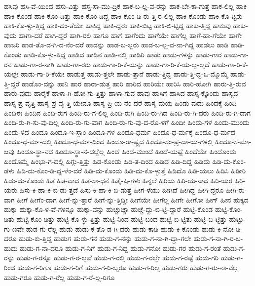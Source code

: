 {ಹಸಿವು
ಹಸಿ-ವೆ-ಯಿಂದ
ಹಸು-ವಿತ್ತು
ಹಸ್ತ-ಸಾ-ಮು-ದ್ರಿಕ
ಹಾಕ-ಬ-ಲ್ಲ-ವ-ರನ್ನು
ಹಾಕ-ಬೇ-ಕಾ-ಗುತ್ತೆ
ಹಾಕ-ಲಿಲ್ಲ
ಹಾಕಿ
ಹಾಕಿ-ಕೊಂಡ
ಹಾಕಿ-ಕೊಂ-ಡಿತ್ತು
ಹಾಕಿ-ಕೊಂ-ಡಿದ್ದ
ಹಾಕಿ-ಕೊಂ-ಡಿ-ರು-ತ್ತಿ-ರ-ಲಿಲ್ಲ
ಹಾಕಿ-ಕೊಂಡು
ಹಾಕಿ-ಕೊ-ಟ್ಟರು
ಹಾಕಿ-ಕೊ-ಳ್ಳು-ತ್ತಿದ್ದ
ಹಾಕಿ-ದಂ-ತೆಯೇ
ಹಾಕಿದ್ದ
ಹಾಕಿ-ದ್ದರು
ಹಾಕಿ-ಬಿಟ್ಟ
ಹಾಕಿ-ಬಿ-ಟ್ಟಿದ್ದ
ಹಾಕು-ತ್ತಿದ್ದ
ಹಾಕುವು
ಹಾಕು-ವುದು
ಹಾಗಾ-ದರೆ
ಹಾಗಿ-ದ್ದರೆ
ಹಾಗಿ-ರಲಿ
ಹಾಗೂ
ಹಾಗೆ
ಹಾಗೆಂದು
ಹಾಗೆಯೇ
ಹಾಗೆಲ್ಲ
ಹಾಗೆ-ಹಾ-ಗೆಯೇ
ಹಾಗೇ
ಹಾಜರಿ
ಹಾಡ-ತೊ-ಡ-ಗಿ-ದ-ನೆಂ-ದರೆ
ಹಾಡನ್ನು
ಹಾಡ-ಬ-ಲ್ಲರು
ಹಾಡ-ಬ-ಲ್ಲ-ವ-ನಾ-ಗಿದ್ದ
ಹಾಡಲು
ಹಾಡಿ
ಹಾಡಿ-ಕೊಂಡು
ಹಾಡಿ-ಕೊ-ಳ್ಳು-ತ್ತಿದ್ದ
ಹಾಡಿದ
ಹಾಡಿನ
ಹಾಡಿ-ನಲ್ಲಿ
ಹಾಡಿರಿ
ಹಾಡು
ಹಾಡು-ಗಳನ್ನು
ಹಾಡು-ಗಾರ
ಹಾಡು-ಗಾ-ರನ
ಹಾಡು-ಗಾ-ರ-ನಾಗಿ
ಹಾಡು-ಗಾ-ರರು
ಹಾಡು-ಗಾ-ರಿ-ಕೆ-ಯನ್ನು
ಹಾಡು-ಗಾ-ರಿ-ಕೆ-ಯ-ಲ್ಲ-ಲ್ಲದೆ
ಹಾಡು-ಗಾ-ರಿ-ಕೆ-ಯಲ್ಲೇ
ಹಾಡು-ಗಾ-ರಿ-ಕೆಯೇ
ಹಾಡುತ್ತ
ಹಾಡು-ತ್ತಲೇ
ಹಾಡು-ತ್ತಾನೆ
ಹಾಡು-ತ್ತಿದ್ದ
ಹಾಡು-ತ್ತಿ-ದ್ದ-ಒ-ಮ್ಮೊಮ್ಮೆ
ಹಾಡು-ತ್ತಿ-ದ್ದರೆ
ಹಾಡೊಂ-ದನ್ನು
ಹಾನಿ
ಹಾರ
ಹಾರಾ-ಡುತ್ತ
ಹಾರಿ
ಹಾರಿದ
ಹಾರಿಯೇ
ಹಾರಿಸಿ
ಹಾರಿ-ಹೋಗಿ
ಹಾರು-ತ್ತಿ-ರುವ
ಹಾರು-ವುದು
ಹಾರೈಕೆ
ಹಾಳಾ-ಗಿ-ಹೋ-ಗು-ತ್ತಿತ್ತು
ಹಾಳಾ-ಗುವ
ಹಾವು
ಹಾಸಿಗೆ
ಹಾಸಿದ
ಹಾಸ್ಯ-ಕ್ಕೊಂದು
ಹಾಸ್ಯದ
ಹಾಸ್ಯ-ಪ್ರ-ವೃತ್ತಿ
ಹಾಸ್ಯ-ಪ್ರ-ವೃ-ತ್ತಿ-ಯೇನೂ
ಹಾಸ್ಯ-ಪ್ರಿ-ಯ-ನೆಂ-ದರೆ
ಹಾಸ್ಯ-ಮಯ
ಹಿಂಡು-ವುದು
ಹಿಂದಕ್ಕೆ
ಹಿಂದಿ
ಹಿಂದಿಈ
ಹಿಂದಿನ
ಹಿಂದಿ-ರುಗ
ಹಿಂದಿ-ರು-ಗ-ಲಿಲ್ಲ
ಹಿಂದಿ-ರುಗಿ
ಹಿಂದಿ-ರು-ಗಿದ
ಹಿಂದಿ-ರು-ಗಿ-ದರು
ಹಿಂದಿ-ರು-ಗಿ-ದಾಗ
ಹಿಂದಿ-ರು-ಗಿ-ಸು-ವು-ದಿಲ್ಲ
ಹಿಂದಿ-ರು-ಗು-ವಾಗ
ಹಿಂದಿ-ರು-ಗು-ವು-ದ-ರೊ-ಳಗೆ
ಹಿಂದೀ
ಹಿಂದು-ಗಳ
ಹಿಂದು-ಮುಂದು
ಹಿಂದು-ಳಿದ
ಹಿಂದೂ
ಹಿಂದೂ-ಇ-ಸ್ಲಾಂ
ಹಿಂದೂ-ಗಳ
ಹಿಂದೂ-ಧರ್ಮ
ಹಿಂದೂ-ಧ-ರ್ಮಕ್ಕೆ
ಹಿಂದೂ-ಧ-ರ್ಮದ
ಹಿಂದೂ-ಧ-ರ್ಮ-ದಲ್ಲಿ
ಹಿಂದೂ-ಧ-ರ್ಮ-ದಿಂದ
ಹಿಂದೂ-ರಾ-ಷ್ಟ್ರದ
ಹಿಂದೂ-ಸಂ-ಪ್ರ-ದಾ-ಯ-ಗಳಲ್ಲಿ
ಹಿಂದೂ-ಸ-ಮಾ-ಜವು
ಹಿಂದೂ-ಸ್ಥಾ-ನದ
ಹಿಂದೂ-ಸ್ಥಾ-ನ-ದಲ್ಲೆಲ್ಲ
ಹಿಂದೆ
ಹಿಂದೆ-ಮುಂದೆ
ಹಿಂದೆ-ಯಷ್ಟೆ
ಹಿಂದೆಯೇ
ಹಿಂದೊಂದು
ಹಿಂದೊಮ್ಮೆ
ಹಿಂಭಾ-ಗ-ದಲ್ಲಿ
ಹಿಗ್ಗು-ತ್ತಿತ್ತು
ಹಿಡ-ಕೊಂಡು
ಹಿಡಿ-ತ-ದಿಂದ
ಹಿಡಿದ
ಹಿಡಿ-ದಿದ್ದ
ಹಿಡಿದು
ಹಿಡಿ-ದು-ಕೊಂ-ಡಳು
ಹಿಡಿ-ದು-ಕೊಂ-ಡಿ-ದ್ದ-ಳೆಂ-ದರೆ
ಹಿಡಿ-ದು-ಕೊಂಡು
ಹಿಡಿ-ದು-ಕೊ-ಳ್ಳುತ್ತೆ
ಹಿಡಿದೊ
ಹಿಡಿ-ಯಲು
ಹಿಡಿಸಿ
ಹಿಡೀರಿ
ಹಿಡು-ದು-ಕೊಂಡು
ಹಿತ
ಹಿತ-ವಾದ
ಹಿತ-ಸಾ-ಧನೆ
ಹಿತೈ-ಷಿ-ಗಳು
ಹಿನ್ನಲೆ
ಹಿರಿಯ
ಹಿರಿ-ಯ-ನಾದ
ಹಿರಿ-ಯರ
ಹಿರಿ-ಯರು
ಹಿಸು-ಕಿ-ಹಾ-ಕಿ-ಬಿ-ಡು-ತ್ತದೆ
ಹಿಸು-ಕಿ-ಹಾ-ಕಿ-ಬಿ-ಡುತ್ತೆ
ಹೀಗ-ಳೆಯು
ಹೀಗಿದೆ
ಹೀಗಿದ್ದ
ಹೀಗಿ-ದ್ದರೂ
ಹೀಗಿ-ರು-ವಾಗ
ಹೀಗೆ
ಹೀಗೆಂ-ದಾಗ
ಹೀಗೆ-ನ್ನು-ತ್ತಾರೆ
ಹೀಗೆ-ನ್ನು-ತ್ತಿದ್ದೀ
ಹೀಗೆಯೇ
ಹೀಗೆಲ್ಲ
ಹೀಗೇ
ಹೀಗೋ
ಹೀಗ್
ಹೀನ
ಹುಕ್ಕದ
ಹುಕ್ಕಾ
ಹುಕ್ಕಾ-ಕೊ-ಳ-ವೆ-ಗಳನ್ನೂ
ಹುಕ್ಕಾ-ವನ್ನು
ಹುಚ್ಚುಚ್ಚಾ
ಹುಚ್ಚೆ-ದ್ದು-ಬಿ-ಟ್ಟಿ-ದ್ದಾರೆ
ಹುಟ್ಟಿ-ಕೊಂಡ
ಹುಟ್ಟಿ-ಕೊಂ-ಡಿತು
ಹುಟ್ಟಿ-ಕೊಂ-ಡಿತ್ತು
ಹುಟ್ಟಿ-ಕೊ-ಳ್ಳು-ತ್ತಿತ್ತು
ಹುಟ್ಟಿ-ನಿಂದ
ಹುಟ್ಟಿ-ಬಂದ
ಹುಟ್ಟಿ-ಬಿ-ಟ್ಟಿತು
ಹುಟ್ಟಿ-ಬಿ-ಟ್ಟಿತ್ತು
ಹುಟ್ಟು-ಗು-ಣವೇ
ಹುಡ-ಗು-ರೆಲ್ಲ
ಹುಡು
ಹುಡು-ಕ-ತೊ-ಡ-ಗಿ-ದರು
ಹುಡು-ಕಾಡಿ
ಹುಡು-ಕಿ-ಕೊಂಡು
ಹುಡು-ಕಿ-ನೋ-ಡಿ-ದರೂ
ಹುಡು-ಕು-ತ್ತಿದ್ದ
ಹುಡುಗ
ಹುಡು-ಗನ
ಹುಡು-ಗ-ನನ್ನು
ಹುಡು-ಗ-ನಾ-ಗಿ-ದ್ದಾ-ಗಲೇ
ಹುಡು-ಗ-ನಾ-ಗಿ-ರ-ಬ-ಹುದು
ಹುಡು-ಗ-ನಾ-ದರೂ
ಹುಡು-ಗ-ನಿಗೆ
ಹುಡು-ಗ-ನಿದ್ದ
ಹುಡು-ಗನೋ
ಹುಡು-ಗರ
ಹುಡು-ಗ-ರಂತೆ
ಹುಡು-ಗ-ರನ್ನು
ಹುಡು-ಗ-ರನ್ನೂ
ಹುಡು-ಗ-ರ-ಲ್ಲವೆ
ಹುಡು-ಗ-ರಲ್ಲಿ
ಹುಡು-ಗ-ರಲ್ಲೇ
ಹುಡು-ಗ-ರಷ್ಟೆ
ಹುಡು-ಗರಿ
ಹುಡು-ಗ-ರಿಂದ
ಹುಡು-ಗ-ರಿಗೂ
ಹುಡು-ಗ-ರಿಗೆ
ಹುಡು-ಗ-ರಿ-ಬ್ಬರೂ
ಹುಡು-ಗ-ರಿಲ್ಲ
ಹುಡು-ಗರು
ಹುಡು-ಗ-ರು-ನಾ-ವೆಲ್ಲ
ಹುಡು-ಗರೂ
ಹುಡು-ಗ-ರೆಲ್ಲ
ಹುಡು-ಗ-ರೆ-ಲ್ಲ-ರಿಗೂ
}
